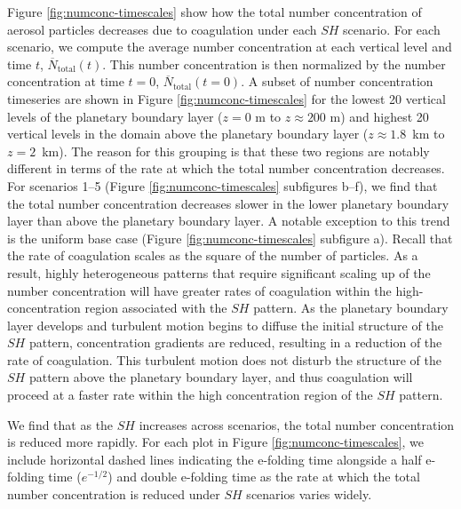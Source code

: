 Figure \ref{fig:numconc-timescales} show how the total number concentration of aerosol particles decreases due to coagulation under each $SH$ scenario. For each scenario, we compute the average number concentration at each vertical level and time $t$, $\overline{N}_{\text{total}}(t)$. This number concentration is then normalized by the number concentration at time $t=0$, $\overline{N}_{\text{total}}(t=0)$. A subset of number concentration timeseries are shown in Figure \ref{fig:numconc-timescales} for the lowest 20 vertical levels of the planetary boundary layer ($z=0$ m to $z\approx200$ m) and highest 20 vertical levels in the domain above the planetary boundary layer ($z\approx1.8$~km to $z=2$~km). The reason for this grouping is that these two regions are notably different in terms of the rate at which the total number concentration decreases. For scenarios 1--5 (Figure \ref{fig:numconc-timescales} subfigures b--f), we find that the total number concentration decreases slower in the lower planetary boundary layer than above the planetary boundary layer. A notable exception to this trend is the uniform base case (Figure \ref{fig:numconc-timescales} subfigure a). Recall that the rate of coagulation scales as the square of the number of particles. As a result, highly heterogeneous patterns that require significant scaling up of the number concentration will have greater rates of coagulation within the high-concentration region associated with the $SH$ pattern. As the planetary boundary layer develops and turbulent motion begins to diffuse the initial structure of the $SH$ pattern, concentration gradients are reduced, resulting in a reduction of the rate of coagulation. This turbulent motion does not disturb the structure of the $SH$ pattern above the planetary boundary layer, and thus coagulation will proceed at a faster rate within the high concentration region of the $SH$ pattern.

We find that as the $SH$ increases across scenarios, the total number concentration is reduced more rapidly. For each plot in Figure \ref{fig:numconc-timescales}, we include horizontal dashed lines indicating the e-folding time alongside a half e-folding time ($e^{-1/2}$) and double e-folding time as the rate at which the total number concentration is reduced under $SH$ scenarios varies widely.  

